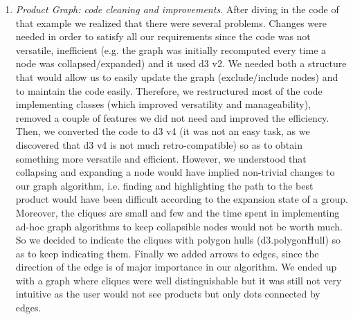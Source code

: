 \documentclass[a4paper,12pt]{article}
\begin{document}
\begin{enumerate}
	\item \textit{Product Graph: code cleaning and improvements}. After diving in the code of that example we realized that there were several problems. Changes were needed in order to satisfy all our requirements since the code was not versatile, inefficient (e.g. the graph was initially recomputed every time a node was collapsed/expanded) and it used d3 v2. We needed both a structure that would allow us to easily update the graph (exclude/include nodes) and to maintain the code easily. Therefore, we restructured most of the code implementing classes (which improved versatility and manageability), removed a couple of features we did not need and improved the efficiency. Then, we converted the code to d3 v4 (it was not an easy task, as we discovered that d3 v4 is not much retro-compatible) so as to obtain something more versatile and efficient. However, we understood that collapsing and expanding a node would have implied non-trivial changes to our graph algorithm, i.e. finding and highlighting the path to the best product would have been difficult according to the expansion state of a group. Moreover, the cliques are small and few and the time spent in implementing ad-hoc graph algorithms to keep collapsible nodes would not be worth much. So we decided to indicate the cliques with polygon hulls (d3.polygonHull) so as to keep indicating them. Finally we added arrows to edges, since the direction of the edge is of major importance in our algorithm.  We ended up with a graph where cliques were well distinguishable but it was still not very intuitive as the user would not see products but only dots connected by edges.


\end{enumerate}
\end{document}
